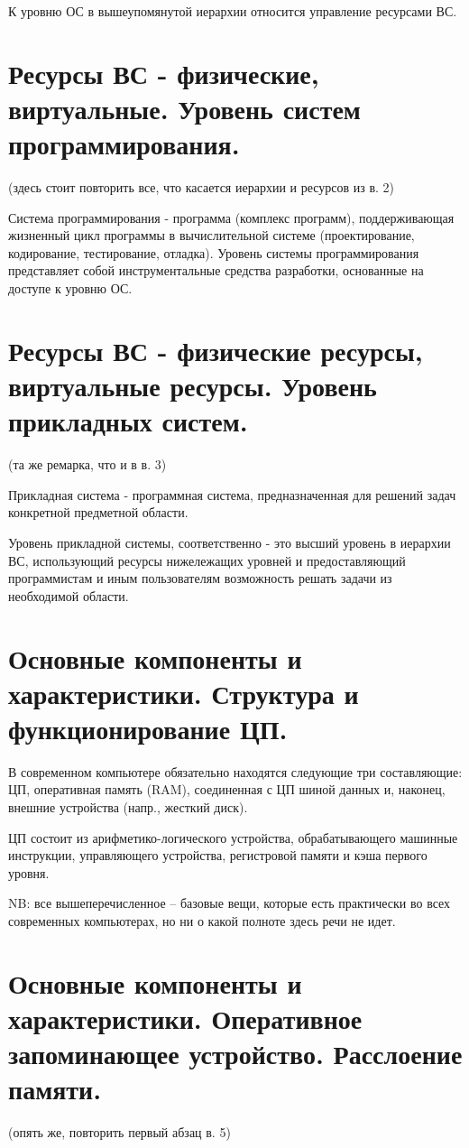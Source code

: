 \documentclass[a4paper,12pt,titlepage,finall]{article}
\begin{document}
К уровню ОС в вышеупомянутой иерархии относится управление ресурсами ВС.


\section{Ресурсы ВС - физические, виртуальные. Уровень систем
программирования.}

(здесь стоит повторить все, что касается иерархии и ресурсов из в. 2)

Система программирования - программа (комплекс программ), поддерживающая жизненный цикл программы в вычислительной системе (проектирование, кодирование, тестирование, отладка).
Уровень системы программирования представляет собой инструментальные средства разработки, основанные на доступе к уровню ОС.

\section{Ресурсы ВС - физические ресурсы, виртуальные ресурсы.
Уровень прикладных систем.}

(та же ремарка, что и в в. 3)

Прикладная система - программная система, предназначенная для решений задач конкретной предметной области.

Уровень прикладной системы, соответственно - это высший уровень в иерархии ВС, использующий ресурсы нижележащих уровней и предоставляющий программистам и иным пользователям возможность решать задачи из необходимой области.

\section{Основные компоненты и характеристики. Структура и
функционирование ЦП.}

В современном компьютере обязательно находятся следующие три составляющие: ЦП, оперативная память (RAM), соединенная с ЦП шиной данных и, наконец, внешние устройства (напр., жесткий диск).

ЦП состоит из арифметико-логического устройства, обрабатывающего машинные инструкции, управляющего устройства, регистровой памяти и кэша первого уровня.

NB: все вышеперечисленное -- базовые вещи, которые есть практически во всех современных компьютерах, но ни о какой полноте здесь речи не идет. 

\section{Основные компоненты и характеристики. Оперативное
запоминающее устройство. Расслоение памяти.}
(опять же, повторить первый абзац в. 5)
\end{document}
